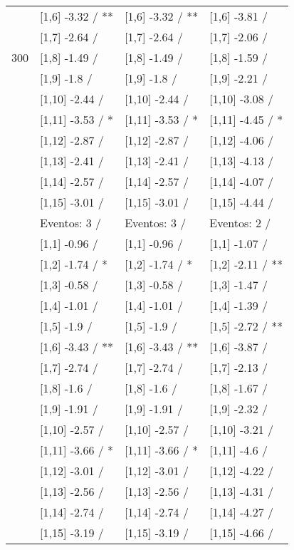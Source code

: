 \begin{table}
\begin{tabular}[t]{llll}
 & {}[1,6] -3.32  / ** & {}[1,6] -3.32  / ** & {}[1,6] -3.81  /\\
 & {}[1,7] -2.64  / & {}[1,7] -2.64  / & {}[1,7] -2.06  /\\
300 & {}[1,8] -1.49  / & {}[1,8] -1.49  / & {}[1,8] -1.59  /\\
\addlinespace
 & {}[1,9] -1.8  / & {}[1,9] -1.8  / & {}[1,9] -2.21  /\\
 & {}[1,10] -2.44  / & {}[1,10] -2.44  / & {}[1,10] -3.08  /\\
 & {}[1,11] -3.53  / * & {}[1,11] -3.53  / * & {}[1,11] -4.45  / *\\
 & {}[1,12] -2.87  / & {}[1,12] -2.87  / & {}[1,12] -4.06  /\\
 & {}[1,13] -2.41  / & {}[1,13] -2.41  / & {}[1,13] -4.13  /\\
\addlinespace
 & {}[1,14] -2.57  / & {}[1,14] -2.57  / & {}[1,14] -4.07  /\\
 & {}[1,15] -3.01  / & {}[1,15] -3.01  / & {}[1,15] -4.44  /\\
 & Eventos:  3 / & Eventos:  3 / & Eventos:  2 /\\
 & {}[1,1] -0.96  / & {}[1,1] -0.96  / & {}[1,1] -1.07  /\\
 & {}[1,2] -1.74  / * & {}[1,2] -1.74  / * & {}[1,2] -2.11  / **\\
\addlinespace
 & {}[1,3] -0.58  / & {}[1,3] -0.58  / & {}[1,3] -1.47  /\\
 & {}[1,4] -1.01  / & {}[1,4] -1.01  / & {}[1,4] -1.39  /\\
 & {}[1,5] -1.9  / & {}[1,5] -1.9  / & {}[1,5] -2.72  / **\\
 & {}[1,6] -3.43  / ** & {}[1,6] -3.43  / ** & {}[1,6] -3.87  /\\
 & {}[1,7] -2.74  / & {}[1,7] -2.74  / & {}[1,7] -2.13  /\\
\addlinespace
500 & {}[1,8] -1.6  / & {}[1,8] -1.6  / & {}[1,8] -1.67  /\\
 & {}[1,9] -1.91  / & {}[1,9] -1.91  / & {}[1,9] -2.32  /\\
 & {}[1,10] -2.57  / & {}[1,10] -2.57  / & {}[1,10] -3.21  /\\
 & {}[1,11] -3.66  / * & {}[1,11] -3.66  / * & {}[1,11] -4.6  /\\
 & {}[1,12] -3.01  / & {}[1,12] -3.01  / & {}[1,12] -4.22  /\\
\addlinespace
 & {}[1,13] -2.56  / & {}[1,13] -2.56  / & {}[1,13] -4.31  /\\
 & {}[1,14] -2.74  / & {}[1,14] -2.74  / & {}[1,14] -4.27  /\\
 & {}[1,15] -3.19  / & {}[1,15] -3.19  / & {}[1,15] -4.66  /\\
\bottomrule
\end{tabular}
\end{table}
